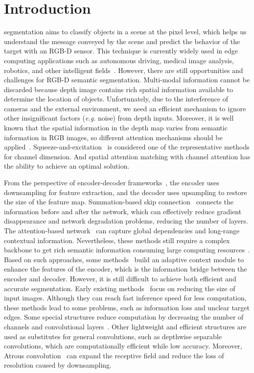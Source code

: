 \documentclass[journal,twoside,web]{ieeecolor}
\begin{document}
\maketitle

\section{Introduction}
\label{sec:introduction}
 segmentation aims to classify objects in a scene at the pixel level, which helps us understand the message conveyed by the scene and predict the behavior of the target with an RGB-D sensor. This technique is currently widely used in edge computing applications such as autonomous driving, medical image analysis, robotics, and other intelligent fields~\cite {9940618}. 
However, there are still opportunities and challenges for RGB-D semantic segmentation. Multi-modal information cannot be discarded because depth image contains rich spatial information available to determine the location of objects. Unfortunately, due to the interference of cameras and the external environment, we need an efficient mechanism to ignore other insignificant factors (\textit{e.g.} noise) from depth inputs. Moreover, it is well known that the spatial information in the depth map varies from semantic information in RGB images, so different attention mechanisms should be applied~\cite{Gated_Fusion}. Squeeze-and-excitation~\cite{SENet} is considered one of the representative methods for channel dimension. And spatial attention matching with channel attention has the ability to achieve an optimal solution.

From the perspective of encoder-decoder frameworks~\cite{RAFNet}, the encoder uses downsampling for feature extraction, and the decoder uses upsampling to restore the size of the feature map. Summation-based skip connection~\cite{EFCN} connects the information before and after the network, which can effectively reduce gradient disappearance and network degradation problems, reducing the number of layers. The attention-based network~\cite{CMANet} can capture global dependencies and long-range contextual information. Nevertheless, these methods still require a complex backbone to get rich semantic information consuming large computing resources~\cite{LF-YOLO}. Based on such approaches, some methods~\cite{TSNet} build an adaptive context module to enhance the features of the encoder, which is the information bridge between the encoder and decoder. However, it is still difficult to achieve both efficient and accurate segmentation. Early existing methods~\cite{ICNet} focus on reducing the size of input images. Although they can reach fast inference speed for less computation, these methods lead to some problems, such as information loss and unclear target edges. Some special structures reduce computation by decreasing the number of channels and convolutional layers~\cite{min12050526}. Other lightweight and efficient structures are used as substitutes for general convolutions, such as depthwise separable convolutions, which are computationally efficient while low accuracy. Moreover, Atrous convolution~\cite{DCNV2} can expand the receptive field and reduce the loss of resolution caused by downsampling. 
\end{document}
